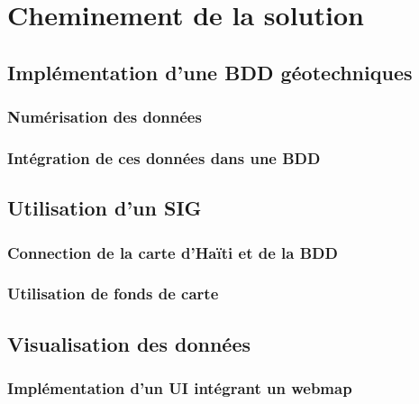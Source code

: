 \section{Cheminement de la solution}
    \subsection{Implémentation d'une BDD géotechniques}
        \subsubsection{Numérisation des données}
            
        \subsubsection{Intégration de ces données dans une BDD}
            
    \subsection{Utilisation d'un SIG}
        \subsubsection{Connection de la carte d'Haïti et de la BDD}
            
        \subsubsection{Utilisation de fonds de carte}
            
    \subsection{Visualisation des données} 
        \subsubsection{Implémentation d'un UI intégrant un webmap}
            
